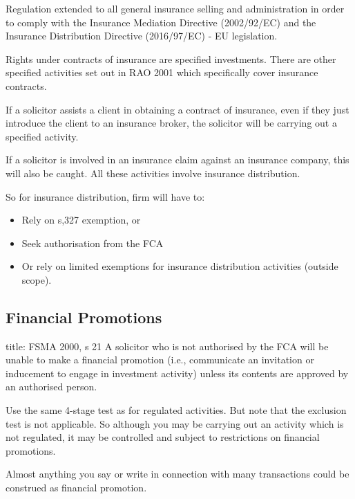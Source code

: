 \documentclass[
]{article}
\newenvironment{Shaded}{}{}
\newcommand{\NormalTok}[1]{#1}
\providecommand{\tightlist}{%
  \setlength{\itemsep}{0pt}\setlength{\parskip}{0pt}}
\begin{document}
Regulation extended to all general insurance selling and administration
in order to comply with the Insurance Mediation Directive (2002/92/EC)
and the Insurance Distribution Directive (2016/97/EC) - EU legislation.

Rights under contracts of insurance are specified investments. There are
other specified activities set out in RAO 2001 which specifically cover
insurance contracts.

If a solicitor assists a client in obtaining a contract of insurance,
even if they just introduce the client to an insurance broker, the
solicitor will be carrying out a specified activity.

If a solicitor is involved in an insurance claim against an insurance
company, this will also be caught. All these activities involve
insurance distribution.

So for insurance distribution, firm will have to:

\begin{itemize}
\tightlist
\item
  Rely on s,327 exemption, or
\item
  Seek authorisation from the FCA
\item
  Or rely on limited exemptions for insurance distribution activities
  (outside scope).
\end{itemize}

\hypertarget{financial-promotions}{%
\subsection{Financial Promotions}\label{financial-promotions}}

\begin{Shaded}
\begin{Highlighting}[]
\NormalTok{title: FSMA 2000, s 21}
\NormalTok{A solicitor who is not authorised by the FCA will be unable to make a financial promotion (i.e., communicate an invitation or inducement to engage in investment activity) unless its contents are approved by an authorised person. }
\end{Highlighting}
\end{Shaded}

Use the same 4-stage test as for regulated activities. But note that the
exclusion test is not applicable. So although you may be carrying out an
activity which is not regulated, it may be controlled and subject to
restrictions on financial promotions.

Almost anything you say or write in connection with many transactions
could be construed as financial promotion.
\end{document}
